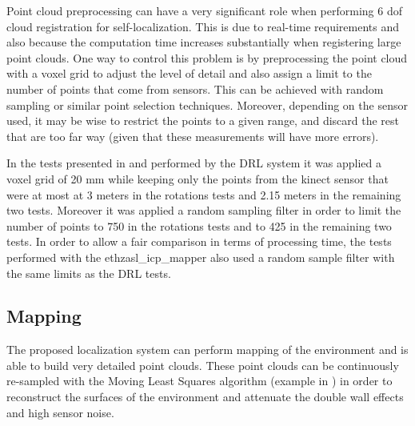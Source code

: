Point cloud preprocessing can have a very significant role when performing 6 \gls{dof} cloud registration for self-localization. This is due to real-time requirements and also because the computation time increases substantially when registering large point clouds. One way to control this problem is by preprocessing the point cloud with a voxel grid to adjust the level of detail and also assign a limit to the number of points that come from sensors. This can be achieved with random sampling or similar point selection techniques. Moreover, depending on the sensor used, it may be wise to restrict the points to a given range, and discard the rest that are too far way (given that these measurements will have more errors).

In the tests presented in  and performed by the DRL system it was applied a voxel grid of 20 mm while keeping only the points from the kinect sensor that were at most at 3 meters in the rotations tests and 2.15 meters in the remaining two tests. Moreover it was applied a random sampling filter in order to limit the number of points to 750 in the rotations tests and to 425 in the remaining two tests. In order to allow a fair comparison in terms of processing time, the tests performed with the ethzasl\_icp\_mapper also used a random sample filter with the same limits as the DRL tests.



\subsection{Mapping}

The proposed localization system can perform mapping of the environment and is able to build very detailed point clouds. These point clouds can be continuously re-sampled with the Moving Least Squares algorithm (example in ) in order to reconstruct the surfaces of the environment and attenuate the double wall effects and high sensor noise.

